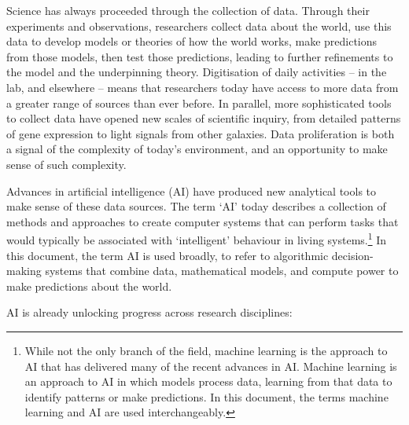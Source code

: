 Science has always proceeded through the collection of data. Through
their experiments and observations, researchers collect data about the
world, use this data to develop models or theories of how the world
works, make predictions from those models, then test those predictions,
leading to further refinements to the model and the underpinning theory.
Digitisation of daily activities -- in the lab, and elsewhere -- means
that researchers today have access to more data from a greater range of
sources than ever before. In parallel, more sophisticated tools to
collect data have opened new scales of scientific inquiry, from detailed
patterns of gene expression to light signals from other galaxies. Data
proliferation is both a signal of the complexity of today's environment,
and an opportunity to make sense of such complexity.

Advances in artificial intelligence (AI) have produced new analytical
tools to make sense of these data sources. The term `AI' today describes
a collection of methods and approaches to create computer systems that
can perform tasks that would typically be associated with `intelligent'
behaviour in living systems.\footnote{While not the only branch of the
  field, machine learning is the approach to AI that has delivered many
  of the recent advances in AI. Machine learning is an approach to AI in
  which models process data, learning from that data to identify
  patterns or make predictions. In this document, the terms machine
  learning and AI are used interchangeably.} In this document, the term
AI is used broadly, to refer to algorithmic decision-making systems that
combine data, mathematical models, and compute power to make predictions
about the world.

AI is already unlocking progress across research disciplines:

